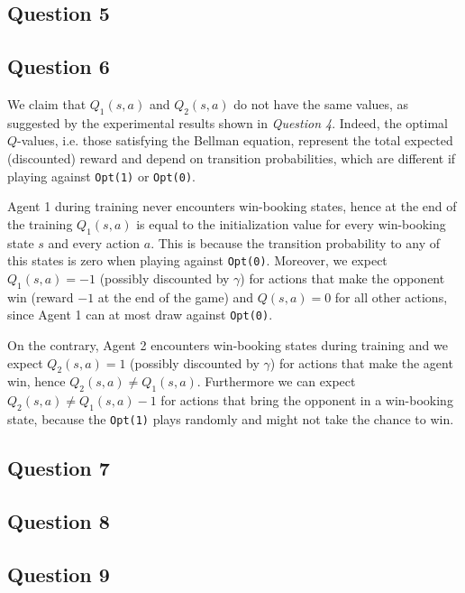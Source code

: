 \documentclass[10pt]{IEEEtran}
\begin{document}
\subsection*{Question 5}
\subsection*{Question 6}
We claim that $Q_1(s,a)$ and $Q_2(s,a)$ do not have the same values, as suggested by the experimental results shown in \emph{Question 4}.
Indeed, the optimal $Q$-values, i.e. those satisfying the Bellman equation, represent the total expected (discounted) reward and depend on transition probabilities, which are different if playing against \texttt{Opt(1)} or \texttt{Opt(0)}. 

Agent 1 during training never encounters win-booking states, hence at the end of the training $Q_1(s,a)$ is equal to the initialization value for every win-booking state $s$ and every action $a$. This is because the transition probability to any of this states is zero when playing against \texttt{Opt(0)}. Moreover, we expect $Q_1(s,a) = -1$ (possibly discounted by $\gamma$) for actions that make the opponent win (reward $-1$ at the end of the game) and $Q(s,a) = 0$ for all other actions, since Agent 1 can at most draw against \texttt{Opt(0)}. 

On the contrary, Agent 2 encounters win-booking states during training and we expect $Q_2(s,a) = 1$ (possibly discounted by $\gamma$) for actions that make the agent win, hence $Q_2(s,a) \neq Q_1(s,a)$. Furthermore we can expect $Q_2(s,a) \neq Q_1(s,a) -1$ for actions that bring the opponent in a win-booking state, because the \texttt{Opt(1)} plays randomly and might not take the chance to win.

\subsection*{Question 7}


\subsection*{Question 8}

\subsection*{Question 9}
\end{document}
